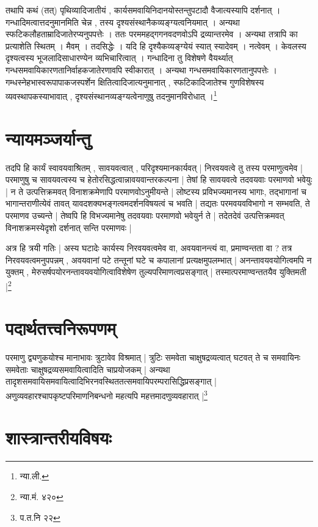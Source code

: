 	तथापि कथं (तत्) पृथिव्यादिजातीयं , कार्यसमवायिनिदानयोस्तन्तुपटादौ वैजात्यस्यापि दर्शनात् । गन्धादिमत्वात्तदनुमानमिति चेन्न , तस्य दृश्यसंस्थानैकव्यङ्ग्यत्वनियमात् । अन्यथा स्फटिकलौहताम्रादिजातेरप्यनुपपत्तेः । ततः परममहद्गगनवदणवोऽपि द्रव्यान्तरमेव । अन्यथा तत्रापि का प्रत्याशेति स्थितम् । मैवम् । तदसिद्धेः । यदि हि दृश्यैकव्यङ्ग्येयं स्यात् स्यादेवम् । नत्वेवम् । केवलस्य दृश्यत्वस्य भूजलादिसाधारण्येन व्यभिचारित्वात् । गन्धादिना तु विशेषणे वैयर्थ्यात् गन्धसमवायिकारणतानिर्वाहकजातेरणावपि स्वीकारात् । अन्यथा गन्धसमवायिकारणतानुपपत्तेः । गम्धस्नेहभास्वरूपापाकजस्पर्शेन क्षितित्वादिजात्यनुमानात् , स्फटिकादिजातेश्च गुणविशेषस्य व्यवस्थापकस्याभावात् , दृश्यसंस्थानव्यङ्ग्यत्वेनाणुषु तदनुमानविरोधात् ।\footnote{न्या.ली.}





\section{न्यायमञ्जर्यान्तु} तदपि हि कार्यं स्वावयवाश्रितम् , सावयवत्वात् , परिदृश्यमानकार्यवत् | निरवयवत्वे तु तस्य परमाणुत्वमेव | परमाणुषु च सावयवत्वस्य च हेतोरसिद्धत्वान्नावयवान्तरकल्पना | तेषां हि सावयवत्वे तदवयवाः परमाणवो भवेयुः | न ते उत्पत्तिक्रमवत् विनाशक्रमेणापि परमाणवोऽनुमीयन्ते | लोष्टस्य प्रविभज्यमानस्य भागाः, तद्भागानां च भागान्तराणीत्येवं तावत् यावदशक्यभङ्गत्वमदर्शनविषयत्वं च भवति | तद्यतः परमवयवविभागो न सम्भवति, ते परमाणव उच्यन्ते | तेष्वपि हि विभज्यमानेषु तदवयवाः परमाणवो भवेयुर्न ते | तदेतदेवं उत्पत्तिक्रमवत् विनाशक्रमस्येदृशो दर्शनात् सन्ति परमाणवः |

अत्र हि त्रयी गतिः | अस्य घटादेः कार्यस्य निरवयवत्वमेव वा, अवयवानन्त्यं वा, प्रमाण्वन्तता वा ? तत्र निरवयवत्वमनुपपन्नम् , अवयवानां पटे तन्तूनां घटे च कपालानां प्रत्यक्षमुपलम्भात् | अनन्तावयवयोगित्वमपि न युक्तम् , मेरुसर्षपयोरनन्तावयवयोगित्वाविशेषेण तुल्यपरिमाणत्वप्रसङ्गात् | तस्मात्परमाण्वन्ततयैव युक्तिमती |\footnote{न्या.मं. ४२०}




\section{पदार्थतत्त्वनिरूपणम्} परमाणु द्व्यणुकयोश्च मानाभावः त्रुटावेव विश्रमात् | त्रुटिः समवेता चाक्षुषद्रव्यत्वात् घटवत् ते च समवायिनः समवेताः चाक्षुषद्रव्यसमवायित्वादिति चाप्रयोजकम् | अन्यथा तादृशसमवायिसमवायित्वादिभिरनवस्थिततत्समवायिपरम्परासिद्धिप्रसङ्गात् | अणुव्यवहारश्चापकृष्टपरिमाणनिबन्धनो महत्यपि महत्तमादणुव्यवहारात् |\footnote{प.त.नि २२}


\section{शास्त्रान्तरीयविषयः}

